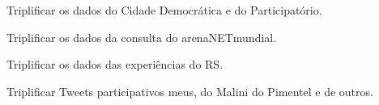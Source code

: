\documentclass[12pt]{report}
\begin{document}
Triplificar os dados do Cidade Democrática e do Participatório.

Triplificar os dados da consulta do arenaNETmundial.

Triplificar os dados das experiências do RS.

Triplificar Tweets participativos meus, do Malini do Pimentel e de outros.


\newpage

\newpage

\newpage
\printindex
\newpage
%
\appendix
\end{document}
